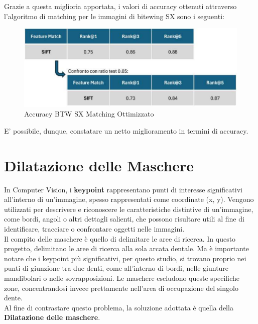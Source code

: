 \documentclass[12pt,a4paper,openright,twoside]{book}
\begin{document}
Grazie a questa miglioria apportata, i valori di accuracy ottenuti attraverso l'algoritmo di matching per le immagini di bitewing SX sono i seguenti:
\begin{figure}[H]
	\centering
	\includegraphics{figures/sx9_1.pdf}
    	\caption{Accuracy BTW SX Matching Ottimizzato}
	\label{fig:sx9}
\end{figure}
E' possibile, dunque, constatare un netto miglioramento in termini di accuracy.

\section{Dilatazione delle Maschere}
In Computer Vision, i \textbf{keypoint} rappresentano punti di interesse significativi all'interno di un'immagine, spesso rappresentati come coordinate (x, y). Vengono utilizzati per descrivere e riconoscere le caratteristiche distintive di un'immagine, come bordi, angoli o altri dettagli salienti, che possono risultare utili al fine di identificare, tracciare o confrontare oggetti nelle immagini.\\

Il compito delle maschere è quello di delimitare le aree di ricerca. In questo progetto, delimitano le aree di ricerca alla sola arcata dentale. Ma è importante notare che i keypoint più significativi, per questo studio, si trovano proprio nei punti di giunzione tra due denti, come all'interno di bordi, nelle giunture mandibolari o nelle sovrapposizioni. Le maschere escludono queste specifiche zone, concentrandosi invece prettamente nell'area di occupazione del singolo dente.\\

Al fine di contrastare questo problema, la soluzione adottata è quella della \textbf{Dilatazione delle maschere}.
\begin{figure}[H]
    \centering
    
\end{figure}
\end{document}
